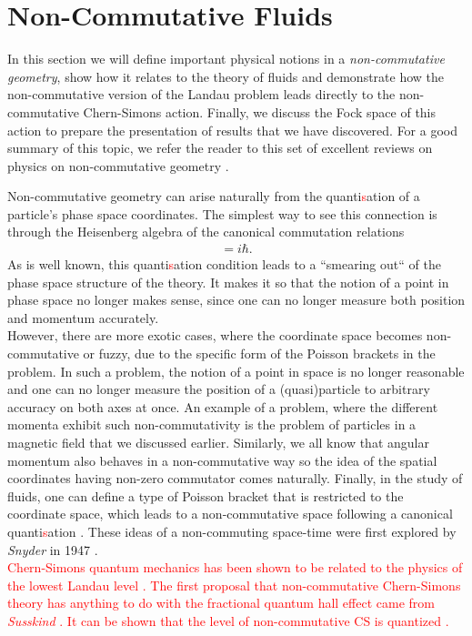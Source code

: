         \section{Non-Commutative Fluids}
    In this section we will define important physical notions in a \textit{non-commutative geometry}, show how it relates to the theory of fluids and demonstrate how the non-commutative version of the Landau problem leads directly to the non-commutative Chern-Simons action. Finally, we discuss the Fock space of this action to prepare the presentation of results that we have discovered. For a good summary of this topic, we refer the reader to this set of excellent reviews on physics on non-commutative geometry \cite{Polychronakos:2007df, Szabo:2001kg, Douglas:2001ba}.

    Non-commutative geometry can arise naturally from the quanti\textcolor{red}{s}ation of a particle's phase space coordinates. The simplest way to see this connection is through the Heisenberg algebra of the canonical commutation relations
    \begin{align}
        [\hat{x}, \hat{p}] = i \hbar.
    \end{align}
    As is well known, this quanti\textcolor{red}{s}ation condition leads to a ``smearing out`` of the phase space structure of the theory. It makes it so that the notion of a point in phase space no longer makes sense, since one can no longer measure both position and momentum accurately. \\
    \indent However, there are more exotic cases, where the coordinate space becomes non-commutative or fuzzy, due to the specific form of the Poisson brackets in the problem. In such a problem, the notion of a point in space is no longer reasonable and one can no longer measure the position of a (quasi)particle to arbitrary accuracy on both axes at once. An example of a problem, where the different momenta exhibit such non-commutativity is the problem of particles in a magnetic field that we discussed earlier. Similarly, we all know that angular momentum also behaves in a non-commutative way so the idea of the spatial coordinates having non-zero commutator comes naturally. Finally, in the study of fluids, one can define a type of Poisson bracket that is restricted to the coordinate space, which leads to a non-commutative space following a canonical quanti\textcolor{red}{s}ation \cite{Jackiw:2002pn}. These ideas of a non-commuting space-time were first explored by \textit{Snyder} in 1947 \cite{Snyder:1946qz, Snyder:1947nq}.\\
    \indent \textcolor{red}{Chern-Simons quantum mechanics has been shown to be related to the physics of the lowest Landau level \cite{Dunne1993, PhysRevD.41.661}. The first proposal that non-commutative Chern-Simons theory has anything to do with the fractional quantum hall effect came from \textit{Susskind} \cite{Susskind:2001fb}. It can be shown that the level of non-commutative CS is quantized \cite{Nair:2001rt, Bak:2001ze}.}
